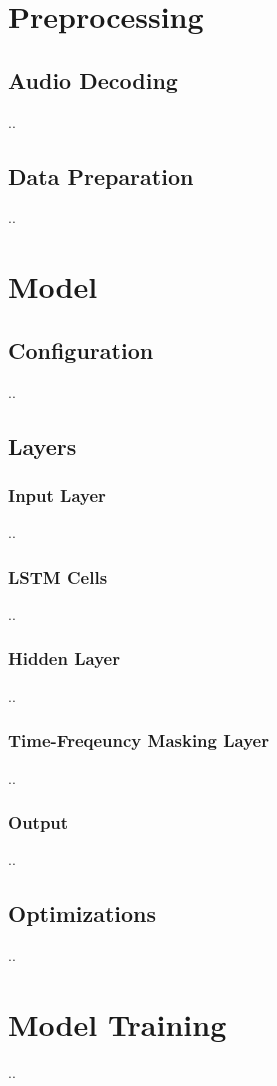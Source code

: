 \documentclass[../Thesis.tex]{subfiles}
\begin{document}
 
\section  {Preprocessing}
\subsection {Audio Decoding}
..

\subsection {Data Preparation}
..

\section {Model}
\subsection {Configuration}
..

\subsection {Layers}
\subsubsection {Input Layer}
..

\subsubsection {LSTM Cells}
..

\subsubsection {Hidden Layer}
..

\subsubsection {Time-Freqeuncy Masking Layer}
..

\subsubsection {Output}
..

\subsection {Optimizations}
..

\section {Model Training}
..
\end{document}

